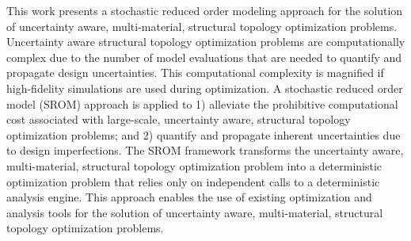 This work presents a stochastic reduced order modeling approach for the solution of uncertainty aware, multi-material, structural topology optimization problems. Uncertainty aware structural topology optimization problems are computationally complex due to the number of model evaluations that are needed to quantify and propagate design uncertainties. This computational complexity is magnified if high-fidelity simulations are used during optimization. A stochastic reduced order model (SROM) approach is applied to 1) alleviate the prohibitive computational cost associated with large-scale, uncertainty aware, structural topology optimization problems; and 2) quantify and propagate inherent uncertainties due to design imperfections. The SROM framework transforms the uncertainty aware, multi-material, structural topology optimization problem into a deterministic optimization problem that relies only on independent calls to a deterministic analysis engine. This approach enables the use of existing optimization and analysis tools for the solution of uncertainty aware, multi-material, structural topology optimization problems.